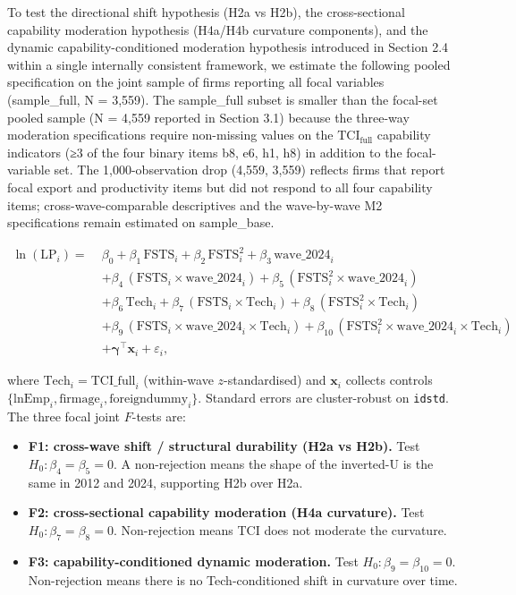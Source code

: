 \documentclass[12pt,a4paper]{article}
\providecommand{\tightlist}{\setlength{\itemsep}{0pt}\setlength{\parskip}{0pt}}
\begin{document}
To test the directional shift hypothesis (H2a vs H2b), the
cross-sectional capability moderation hypothesis (H4a/H4b curvature
components), and the dynamic capability-conditioned moderation
hypothesis introduced in Section 2.4 within a single internally
consistent framework, we estimate the following pooled specification on
the joint sample of firms reporting all focal variables (sample\_full, N
= 3,559). The sample\_full subset is smaller than the focal-set pooled
sample (N = 4,559 reported in Section 3.1) because the three-way
moderation specifications require non-missing values on the
\(\mathrm{TCI}_{\text{full}}\) capability indicators (≥3 of the four
binary items b8, e6, h1, h8) in addition to the focal-variable set. The
1,000-observation drop (4,559, 3,559) reflects firms that report focal
export and productivity items but did not respond to all four capability
items; cross-wave-comparable descriptives and the wave-by-wave M2
specifications remain estimated on sample\_base.

\[
\begin{aligned}
\ln(\mathrm{LP}_i) =\;& \beta_0 + \beta_1\,\mathrm{FSTS}_i + \beta_2\,\mathrm{FSTS}_i^2 + \beta_3\,\mathrm{wave\_2024}_i \\
& + \beta_4\,(\mathrm{FSTS}_i \times \mathrm{wave\_2024}_i) + \beta_5\,(\mathrm{FSTS}_i^2 \times \mathrm{wave\_2024}_i) \\
& + \beta_6\,\mathrm{Tech}_i + \beta_7\,(\mathrm{FSTS}_i \times \mathrm{Tech}_i) + \beta_8\,(\mathrm{FSTS}_i^2 \times \mathrm{Tech}_i) \\
& + \beta_9\,(\mathrm{FSTS}_i \times \mathrm{wave\_2024}_i \times \mathrm{Tech}_i) + \beta_{10}\,(\mathrm{FSTS}_i^2 \times \mathrm{wave\_2024}_i \times \mathrm{Tech}_i) \\
& + \boldsymbol{\gamma}^{\top}\!\mathbf{x}_i + \varepsilon_i,
\end{aligned}
\]

where \(\mathrm{Tech}_i = \mathrm{TCI\_full}_i\) (within-wave
\(z\)-standardised) and \(\mathbf{x}_i\) collects controls
\(\{\mathrm{lnEmp}_i, \mathrm{firmage}_i, \mathrm{foreigndummy}_i\}\).
Standard errors are cluster-robust on \texttt{idstd}. The three focal
joint \(F\)-tests are:

\begin{itemize}
\tightlist
\item
  \textbf{F1: cross-wave shift / structural durability (H2a vs H2b).}
  Test \(H_0: \beta_4 = \beta_5 = 0\). A non-rejection means the shape
  of the inverted-U is the same in 2012 and 2024, supporting H2b over
  H2a.
\item
  \textbf{F2: cross-sectional capability moderation (H4a curvature).}
  Test \(H_0: \beta_7 = \beta_8 = 0\). Non-rejection means TCI does not
  moderate the curvature.
\item
  \textbf{F3: capability-conditioned dynamic moderation.} Test
  \(H_0: \beta_9 = \beta_{10} = 0\). Non-rejection means there is no
  Tech-conditioned shift in curvature over time.
\end{itemize}
\end{document}
